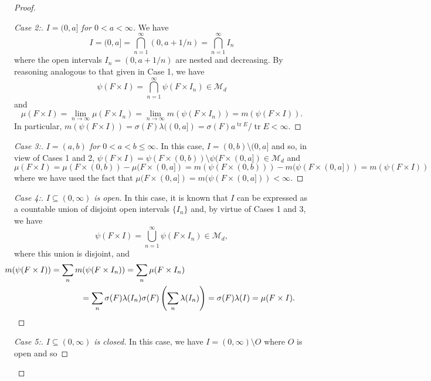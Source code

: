 \documentclass[11pt]{article}
\theoremstyle{theorem}
\newcommand*{\myproofname}{Proof}
\newenvironment{subproof}[1][\myproofname]{\begin{proof}[#1]\renewcommand*{\qedsymbol}{$\mathbin{/\mkern-6mu/}$}}{\end{proof}}
\newcommand\tr{\operatorname{tr}}
\begin{document}
\begin{proof}
\begin{subproof}[Case 2:]\textit{$I=(0,a]$ for $0<a<\infty$.} We have
\begin{equation*}
I=(0,a]=\bigcap_{n=1}^\infty (0,a+1/n)=\bigcap_{n=1}^\infty I_n
\end{equation*}
where the open intervals $I_n=(0,a+1/n)$ are nested and decreasing. By reasoning analogous to that given in Case 1, we have
\begin{equation*}
\psi(F\times I)=\bigcap_{n=1}^\infty \psi(F\times I_n)\in \mathcal{M}_d
\end{equation*}
and
\begin{equation*}
\mu(F\times I)=\lim_{n\to\infty}\mu(F\times I_n)=\lim_{n\to\infty}m(\psi(F\times I_n))=m(\psi(F\times I)).
\end{equation*}
In particular, $m(\psi(F\times I))=\sigma(F)\lambda((0,a])=\sigma(F)a^{\tr E}/\tr E<\infty.$
\end{subproof}
\begin{subproof}[Case 3:]\textit{$I=(a,b)$ for $0<a<b\leq \infty$.} In this case, $I=(0,b)\setminus (0,a]$ and so, in view of Cases 1 and 2, $\psi(F\times I)=\psi(F\times (0,b))\setminus \psi(F\times(0,a])\in\mathcal{M}_d$ and
\begin{equation*}
\mu(F\times I)=\mu(F\times (0,b))-\mu(F\times(0,a])=m(\psi(F\times (0,b)))-m(\psi(F\times (0,a]))=m(\psi(F\times I))
\end{equation*}
where we have used the fact that $\mu(F\times(0,a])=m(\psi(F\times (0,a]))<\infty$.
\end{subproof}
\begin{subproof}[Case 4:]\textit{$I\subseteq (0,\infty)$ is open.} In this case, it is known that $I$ can be expressed as a countable union of disjoint open intervals $\{I_n\}$ and, by virtue of Cases 1 and 3, we have
\begin{equation*}
\psi(F\times I)=\bigcup_{n=1}^\infty\psi(F\times I_n)\in\mathcal{M}_d,
\end{equation*}
where this union is disjoint, and
\begin{eqnarray*}
\lefteqn{\hspace{-1cm}m(\psi(F\times I))=\sum_n m(\psi(F\times I_n))=\sum_n \mu(F\times I_n)}\\
&&\hspace{2cm}=\sum_n \sigma(F)\lambda(I_n)\sigma(F)\left(\sum_n \lambda(I_n)\right)=\sigma(F)\lambda(I)=\mu(F\times I).
\end{eqnarray*}
\end{subproof}
\begin{subproof}[Case 5:]\textit{$I\subseteq (0,\infty)$ is closed.} In this case, we have $I=(0,\infty)\setminus O$ where $O$ is open and so

\end{subproof}
\end{proof}
\end{document}
